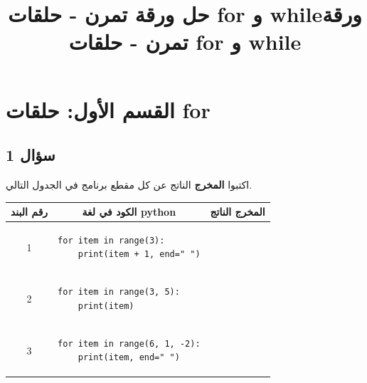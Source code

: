 \documentclass[14pt]{extarticle}
\title{حل ورقة تمرن - حلقات \textenglish{for} و \textenglish{while}}
\title{ورقة تمرن - حلقات \textenglish{for} و \textenglish{while}}
\begin{document}
\maketitle
\thispagestyle{fancy}

\section*{القسم الأول: حلقات \textenglish{for}}

\subsection*{سؤال 1}
اكتبوا \textbf{المخرج} الناتج عن كل مقطع برنامج في الجدول التالي.

{\small
\renewcommand{\arraystretch}{1.3}
\begin{longtable}{|c|p{}|p{}|}
\hline
\multicolumn{1}{|c|}{\textbf{رقم البند}} & \multicolumn{1}{c|}{\textbf{الكود في لغة \textenglish{python}}} & \multicolumn{1}{c|}{\textbf{المخرج الناتج}} \\
\hline
\endhead
1 &
\begin{pycell}
\begin{english}
\begin{verbatim}
for item in range(3):
    print(item + 1, end=" ")
\end{verbatim}
\end{english}
\end{pycell} & \rule{0pt}{1.3cm} \\
\hline
2 &
\begin{pycell}
\begin{english}
\begin{verbatim}
for item in range(3, 5):
    print(item)
\end{verbatim}
\end{english}
\end{pycell} & \rule{0pt}{1.3cm} \\
\hline
3 &
\begin{pycell}
\begin{english}
\begin{verbatim}
for item in range(6, 1, -2):
    print(item, end=" ")
\end{verbatim}
\end{english}
\end{pycell} & \rule{0pt}{1.3cm} \\

\end{longtable}}
\end{document}
